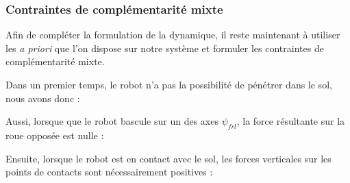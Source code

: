 					
			\subsubsection{Contraintes de complémentarité mixte}
			
				Afin de compléter la formulation de la dynamique, il reste maintenant à utiliser les \textit{a priori} que l'on dispose sur notre système et formuler les contraintes de complémentarité mixte.
				
				Dans un premier temps, le robot n'a pas la possibilité de pénétrer dans le sol, nous avons donc :
				
				Aussi, lorsque que le robot bascule sur un des axes $\psi_{frl}$, la force résultante sur la roue opposée est nulle :
				
				Ensuite, lorsque le robot est en contact avec le sol, les forces verticales sur les points de contacts sont nécessairement positives :
				
